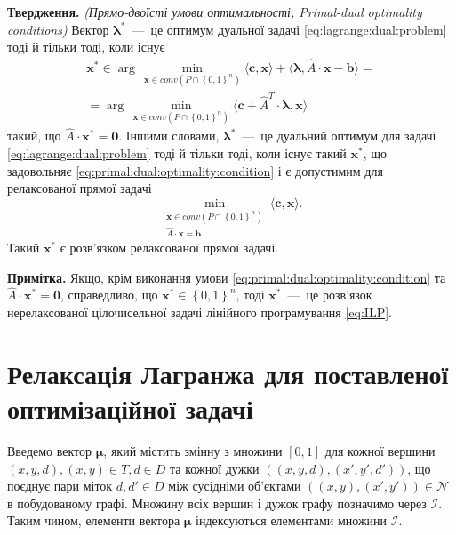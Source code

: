 \textbf{Твердження.}
\textit{(Прямо-двоїсті умови оптимальності, Primal-dual optimality conditions)}
Вектор $\pmb{\lambda}^*$~---~це оптимум дуальної задачі
\eqref{eq:lagrange:dual:problem} тоді й тільки тоді, коли існує
\begin{equation} \label{eq:primal:dual:optimality:condition}
\begin{gathered}
    \pmb{x}^* \in
    \arg\,\min \limits_{\pmb{x} \in conv \left( P \cap \left\{ 0, 1\right\}^n\right)}
        \langle \pmb{c}, \pmb{x} \rangle +
        \langle \pmb{\lambda}, \hat{A} \cdot \pmb{x} - \pmb{b} \rangle = \\
    = \arg\,\min \limits_{\pmb{x} \in conv \left( P \cap \left\{ 0, 1\right\}^n\right)}
        \langle \pmb{c} + \hat{A}^T \cdot \pmb{\lambda}, \pmb{x} \rangle
\end{gathered}
\end{equation}
такий, що $\hat{A} \cdot \pmb{x}^* = \pmb{0}$.
Іншими словами, $\pmb{\lambda}^*$~---~це дуальний оптимум для задачі
\eqref{eq:lagrange:dual:problem} тоді й тільки тоді,
коли існує такий $\pmb{x}^*$,
що задовольняє \eqref{eq:primal:dual:optimality:condition}
і є допустимим для релаксованої прямої задачі
\begin{equation*}
    \min \limits_{\substack{\pmb{x} \in conv \left( P \cap \left\{ 0, 1 \right\}^n\right) \\
                            \hat{A} \cdot \pmb{x} = \pmb{b}}}
        \langle \pmb{c}, \pmb{x} \rangle.
\end{equation*}
Такий $\pmb{x}^*$ є розв'язком релаксованої прямої задачі.

\textbf{Примітка.}
Якщо, крім виконання умови \eqref{eq:primal:dual:optimality:condition} та
$\hat{A} \cdot \pmb{x}^* = \pmb{0}$, справедливо,
що $\pmb{x}^* \in \left\{ 0, 1 \right\}^n$,
тоді $\pmb{x}^*$~---~це розв'язок нерелаксованої
цілочисельної задачі лінійного програмування \eqref{eq:ILP}.

\section{Релаксація Лагранжа для поставленої оптимізаційної задачі}

Введемо вектор $\pmb{\mu}$, який містить змінну з множини $ \left[ 0, 1 \right]$
для кожної вершини
$\left( x, y, d \right), \left(x, y \right) \in T, d \in D$ та кожної дужки
$\left( \left( x, y, d \right), \left(x', y', d' \right) \right)$,
що поєднує пари міток $d, d' \in D$ між сусідніми об'єктами
$\left(\left(x, y \right), \left(x', y' \right) \right) \in \mathcal{N}$
в побудованому графі.
Множину всіх вершин і дужок графу позначимо через $\mathcal{I}$.
Таким чином, елементи вектора $\pmb{\mu}$
індексуються елементами множини $\mathcal{I}$.

